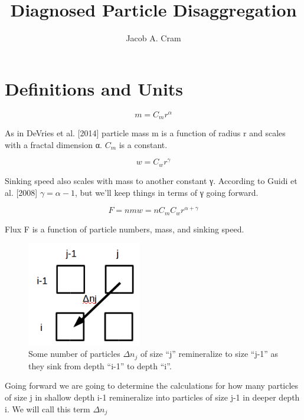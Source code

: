 \documentclass[a4paper,12pt]{article}
\newcommand\addtag{\refstepcounter{equation}\tag{\theequation}}
\begin{document}
\title{Diagnosed Particle Disaggregation}
\author{Jacob A. Cram}
\maketitle

\section{Definitions and Units}

\begin{equation}
  m = C_mr^\alpha %
  \label{eqn:m}
\end{equation}

As in DeVries et al. [2014] particle mass m is a function of radius r and scales with a fractal dimension α. $C_m$ is a constant.

\begin{equation}
  w = C_wr^\gamma %
  \label{eqn:w}
\end{equation}

Sinking speed also scales with mass to another constant γ. 
According to Guidi et al. [2008] $\gamma = \alpha - 1$, but we'll keep things in terms of γ going forward.

\begin{equation}
  F = nmw = n C_m C_w r^{\alpha + \gamma}
\end{equation}

Flux F is a function of particle numbers, mass, and sinking speed.


\begin{figure}[h]
  \includegraphics[width=5cm]{./ijFig2.png}
  \centering
  \caption{Some number of particles $\Delta n_j$ of size ``j'' remineralize to size ``j-1'' as they sink from depth ``i-1'' to depth ``i''.}
  \label{fig:boxes}
\end{figure}

Going forward we are going to determine the calculations for how many particles of size j in shallow depth i-1 remineralize into particles of size j-1 in deeper depth i. We will call this term $\Delta n_j$
\end{document}
